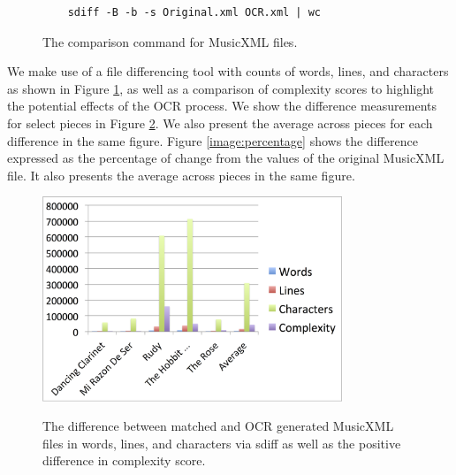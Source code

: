 \documentclass[12pt]{report}
\begin{document}
\begin{figure}[ht!]
	\centering
    \caption{The comparison command for MusicXML files.}
	\lstset{language=bash} 
    \begin{lstlisting}
    sdiff -B -b -s Original.xml OCR.xml | wc
    \end{lstlisting}
    \label{image:sdiff}
\end{figure}

We make use of a file differencing tool with counts of words, lines, and characters as shown in Figure \ref{image:sdiff}, as well as a comparison of complexity scores to highlight the potential effects of the OCR process. We show the difference measurements for select pieces in Figure \ref{image:difference}. We also present the average across pieces for each difference in the same figure. Figure \ref{image:percentage} shows the difference expressed as the percentage of change from the values of the original MusicXML file. It also presents the average across pieces in the same figure.


\begin{figure}
	\centering
		\caption{The difference between matched and OCR generated MusicXML files in words, lines, and characters via sdiff as well as the positive difference in complexity score.}
		\includegraphics[width=0.8\textwidth]{DifferenceOCR.png}
		\label{image:difference}
\end{figure}
\end{document}
